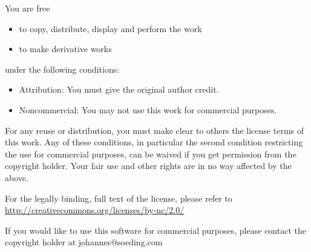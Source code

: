 \documentclass[11pt,a4paper]{article}
\begin{document}
You are free
\begin{itemize}
  \item{to copy, distribute, display and perform the work}
  \item{to make derivative works}
\end{itemize}
under the following conditions:
\begin{itemize}
  \item{Attribution: You must give the original author credit.}
  \item{Noncommercial: You may not use this work for commercial purposes.}
\end{itemize}
For any reuse or distribution, you must make clear to others the license terms of this work.
Any of these conditions, in particular the second condition restricting the use for commercial purposes, 
can be waived if you get permission from the copyright holder.
Your fair use and other rights are in no way affected by the above.

For the legally binding, full text of the license, please refer to \url{http://creativecommons.org/licenses/by-nc/2.0/}

If you would like to use this software for commercial purposes, please contact the copyright holder at 
johannes@soeding.com

\newpage
\end{document}
